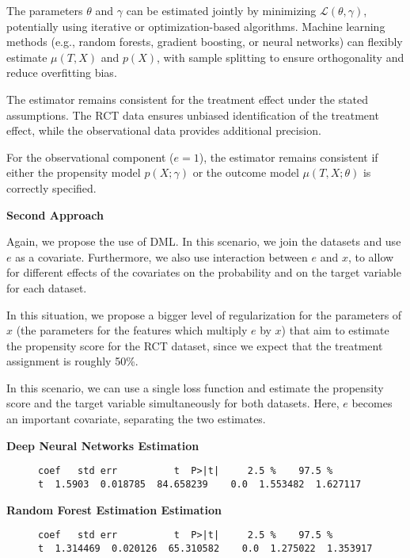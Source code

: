 \documentclass{article}
\begin{document}
The parameters \(\theta\) and \(\gamma\) can be estimated jointly by minimizing \(\mathcal{L}(\theta, \gamma)\), potentially using iterative or optimization-based algorithms. Machine learning methods (e.g., random forests, gradient boosting, or neural networks) can flexibly estimate \(\mu(T, X)\) and \(p(X)\), with sample splitting to ensure orthogonality and reduce overfitting bias.

The estimator remains consistent for the treatment effect under the stated assumptions. The RCT data ensures unbiased identification of the treatment effect, while the observational data provides additional precision.

For the observational component (\( e=1 \)), the estimator remains consistent if either the propensity model \( p(X; \gamma) \) or the outcome model \( \mu(T, X; \theta) \) is correctly specified.

\textbf{Second Approach}

Again, we propose the use of DML. In this scenario, we join the datasets and use $e$ as a covariate. Furthermore, we also use interaction between $e$ and $x$, to allow for different effects of the covariates on the probability and on the target variable for each dataset.

In this situation, we propose a bigger level of regularization for the parameters of $x$ (the parameters for the features which multiply $e$ by $x$) that aim to estimate the propensity score for the RCT dataset, since we expect that the treatment assignment is roughly 50\%.

In this scenario, we can use a single loss function and estimate the propensity score and the target variable simultaneously for both datasets. Here, $e$ becomes an important covariate, separating the two estimates.

\textbf{Deep Neural Networks Estimation}
\begin{figure}[H]
  \begin{lstlisting}[style=RstyleComment, caption=ATE and Confidence Interval Estimates Ignoring Covariates]
coef   std err          t  P>|t|     2.5 %    97.5 %
t  1.5903  0.018785  84.658239    0.0  1.553482  1.627117
  \end{lstlisting}
\end{figure}

\textbf{Random Forest Estimation Estimation}
\begin{figure}[H]
  \begin{lstlisting}[style=RstyleComment, caption=ATE and Confidence Interval Estimates Ignoring Covariates]
coef   std err          t  P>|t|     2.5 %    97.5 %
t  1.314469  0.020126  65.310582    0.0  1.275022  1.353917
\end{lstlisting}
\end{figure}
\end{document}
